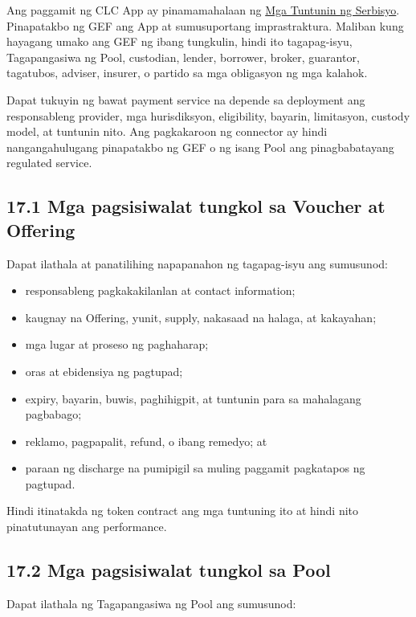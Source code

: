 \documentclass[11pt]{article}
\begin{document}
Ang paggamit ng CLC App ay pinamamahalaan ng \href{https://docs.cosmolocal.credit/fil/governance/terms}{Mga Tuntunin ng Serbisyo}. Pinapatakbo ng GEF ang App at sumusuportang imprastraktura. Maliban kung hayagang umako ang GEF ng ibang tungkulin, hindi ito tagapag-isyu, Tagapangasiwa ng Pool, custodian, lender, borrower, broker, guarantor, tagatubos, adviser, insurer, o partido sa mga obligasyon ng mga kalahok.

Dapat tukuyin ng bawat payment service na depende sa deployment ang responsableng provider, mga hurisdiksyon, eligibility, bayarin, limitasyon, custody model, at tuntunin nito. Ang pagkakaroon ng connector ay hindi nangangahulugang pinapatakbo ng GEF o ng isang Pool ang pinagbabatayang regulated service.

\subsection*{17.1 Mga pagsisiwalat tungkol sa Voucher at Offering}

Dapat ilathala at panatilihing napapanahon ng tagapag-isyu ang sumusunod:

\begin{itemize}[leftmargin=*]
\item responsableng pagkakakilanlan at contact information;
\item kaugnay na Offering, yunit, supply, nakasaad na halaga, at kakayahan;
\item mga lugar at proseso ng paghaharap;
\item oras at ebidensiya ng pagtupad;
\item expiry, bayarin, buwis, paghihigpit, at tuntunin para sa mahalagang pagbabago;
\item reklamo, pagpapalit, refund, o ibang remedyo; at
\item paraan ng discharge na pumipigil sa muling paggamit pagkatapos ng pagtupad.
\end{itemize}
Hindi itinatakda ng token contract ang mga tuntuning ito at hindi nito pinatutunayan ang performance.

\subsection*{17.2 Mga pagsisiwalat tungkol sa Pool}

Dapat ilathala ng Tagapangasiwa ng Pool ang sumusunod:
\end{document}
